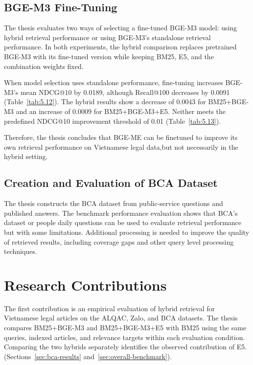 \subsection{BGE-M3 Fine-Tuning}

The thesis evaluates two ways of selecting a fine-tuned BGE-M3 model: using hybrid retrieval performance or using BGE-M3's standalone retrieval performance. In both experiments, the hybrid comparison replaces pretrained BGE-M3 with its fine-tuned version while keeping BM25, E5, and the combination weights fixed.


When model selection uses standalone performance, fine-tuning increases BGE-M3's mean NDCG@10 by 0.0189, although Recall@100 decreases by 0.0091 (Table~\ref{tab:5.12}). The hybrid results show a decrease of 0.0043 for BM25+BGE-M3 and an increase of 0.0009 for BM25+BGE-M3+E5. Neither meets the predefined NDCG@10 improvement threshold of 0.01 (Table~\ref{tab:5.13}).

Therefore, the thesis concludes that BGE-ME can be finetuned to improve its own retrieval performance on Vietnamese legal data,but not necessarily in the hybrid setting.

\subsection{Creation and Evaluation of BCA Dataset}

The thesis constructs the BCA dataset from public-service questions and published answers. The benchmark performance evaluation shows that BCA's dataset or people daily questions can be used to evaluate retrieval performance but with some limitations. Additional processing is needed to improve the quality of retrieved results, including coverage gaps and other query level processing techniques.

\section{Research Contributions}

The first contribution is an empirical evaluation of hybrid retrieval for Vietnamese legal articles on the ALQAC, Zalo, and BCA datasets. The thesis compares BM25+BGE-M3 and BM25+BGE-M3+E5 with BM25 using the same queries, indexed articles, and relevance targets within each evaluation condition. Comparing the two hybrids separately identifies the observed contribution of E5. (Sections~\ref{sec:bca-results} and~\ref{sec:overall-benchmark}).

